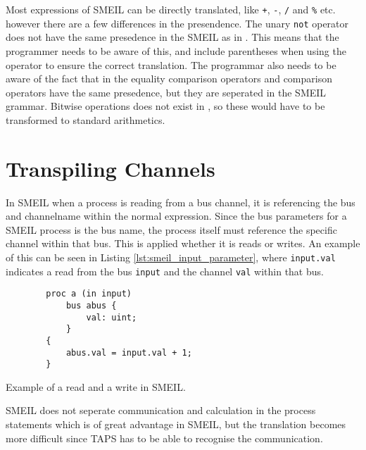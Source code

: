 Most expressions of SMEIL can be directly translated, like \texttt{+}, \texttt{-}, \texttt{/} and \texttt{\%} etc. however there are a few differences in the presendence. The unary \texttt{not} operator does not have the same presedence in the SMEIL as in \cspm{}. This means that the programmer needs to be aware of this, and include parentheses when using the operator to ensure the correct translation. The programmar also needs to be aware of the fact that in \cspm{} the equality comparison operators and comparison operators have the same presedence, but they are seperated in the SMEIL grammar.
Bitwise operations does not exist in \cspm{}, so these would have to be transformed to standard arithmetics. %

\section{Transpiling Channels}
In SMEIL when a process is reading from a bus channel, it is referencing the bus and channelname within the normal expression. Since the bus parameters for a SMEIL process is the bus name, the process itself must reference the specific channel within that bus. This is applied whether it is reads or writes.
An example of this can be seen in Listing \ref{lst:smeil_input_parameter}, where \texttt{input.val} indicates a read from the bus \texttt{input} and the channel \texttt{val} within that bus.

\begin{listing}
    \begin{verbatim}
        proc a (in input)
            bus abus {
                val: uint;
            }
        {
            abus.val = input.val + 1;
        }
    \end{verbatim}
    \caption{Example of a read and a write in SMEIL.}
    \label{lst:smeil_input_parameter}
\end{listing}
SMEIL does not seperate communication and calculation in the process statements which is of great advantage in SMEIL, but the translation becomes more difficult since TAPS has to be able to recognise the communication.

